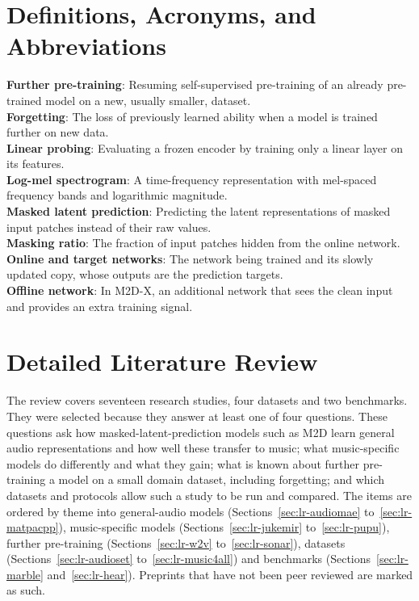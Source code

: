 \documentclass{FastFyp}
\begin{document}
\section{Definitions, Acronyms, and Abbreviations}
\label{sec:lr-defs}
\textbf{Further pre-training}: Resuming self-supervised pre-training of an already pre-trained model on a new, usually smaller, dataset.\\
\textbf{Forgetting}: The loss of previously learned ability when a model is trained further on new data.\\
\textbf{Linear probing}: Evaluating a frozen encoder by training only a linear layer on its features.\\
\textbf{Log-mel spectrogram}: A time-frequency representation with mel-spaced frequency bands and logarithmic magnitude.\\
\textbf{Masked latent prediction}: Predicting the latent representations of masked input patches instead of their raw values.\\
\textbf{Masking ratio}: The fraction of input patches hidden from the online network.\\
\textbf{Online and target networks}: The network being trained and its slowly updated copy, whose outputs are the prediction targets.\\
\textbf{Offline network}: In M2D-X, an additional network that sees the clean input and provides an extra training signal.

\section{Detailed Literature Review}
\label{sec:lr-detailed}
The review covers seventeen research studies, four datasets and two benchmarks. They were selected because they answer at least one of four questions. These questions ask how masked-latent-prediction models such as M2D learn general audio representations and how well these transfer to music; what music-specific models do differently and what they gain; what is known about further pre-training a model on a small domain dataset, including forgetting; and which datasets and protocols allow such a study to be run and compared. The items are ordered by theme into general-audio models (Sections~\ref{sec:lr-audiomae} to~\ref{sec:lr-matpacpp}), music-specific models (Sections~\ref{sec:lr-jukemir} to~\ref{sec:lr-pupu}), further pre-training (Sections~\ref{sec:lr-w2v} to~\ref{sec:lr-sonar}), datasets (Sections~\ref{sec:lr-audioset} to~\ref{sec:lr-music4all}) and benchmarks (Sections~\ref{sec:lr-marble} and~\ref{sec:lr-hear}). Preprints that have not been peer reviewed are marked as such.
\end{document}
